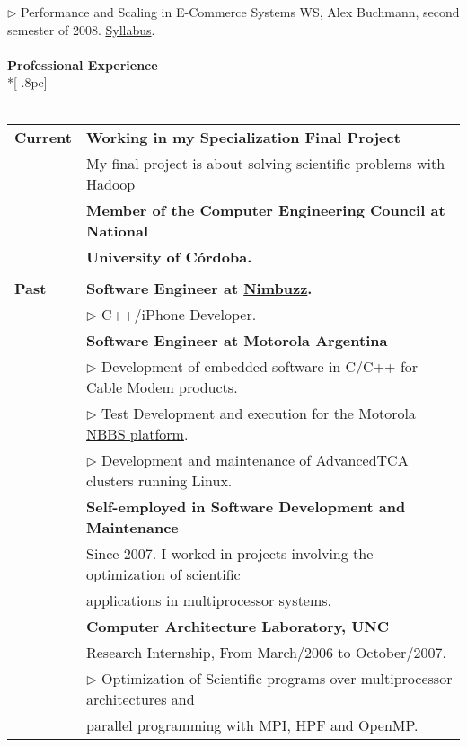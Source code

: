 \documentclass[a4paper,11pt,english]{article}
\begin{document}
$\triangleright$ Performance and Scaling in E-Commerce Systems WS, Alex Buchmann, second semester of 2008. 
\href{http://www.dvs.tu-darmstadt.de/teaching/perf/2008/}{Syllabus}.\\
\\
{\large \bf Professional Experience}\\*[-.8pc]
\underline{\hspace{6in}}
\\
\\
\begin{tabular}{ p{2cm} l }
  {\bf Current} & {\bf Working in my Specialization Final Project}\\
                & {My final project is about solving scientific problems with \href{http://hadoop.apache.org/}{Hadoop}}\\
				& {\bf Member of the Computer Engineering Council at National} \\
				& {\bf University of C\'ordoba.}\\ \\
  {\bf Past}&   {\bf Software Engineer at \href{http://www.nimbuzz.com/en/about}{Nimbuzz}.}\\ 
			&   $\triangleright$ C++/iPhone Developer.\\
			& 	{\bf Software Engineer at Motorola Argentina}\\
			& 	$\triangleright$ Development of embedded software in C/C++ for Cable Modem products.\\
			&	$\triangleright$ Test Development and execution for the Motorola \href{http://www.netopia.com/software/products/nbbs/nbbs_ds.pdf}{NBBS platform}.\\
			&	$\triangleright$ Development and maintenance of \href{http://en.wikipedia.org/wiki/Advanced_Telecommunications_Computing_Architecture}{AdvancedTCA} clusters running Linux.\\
			& 	{\bf Self-employed in Software Development and Maintenance}\\
			&	Since 2007. I worked in projects involving the optimization of scientific\\
			&	applications in multiprocessor systems.\\
			& 	{\bf Computer Architecture Laboratory, UNC}\\
			& 	Research Internship, From March/2006 to October/2007.\\
			& 	$\triangleright$ Optimization of Scientific programs over multiprocessor architectures and\\
			& 	parallel programming with MPI, HPF and OpenMP.\\

\end{tabular}
\end{document}
